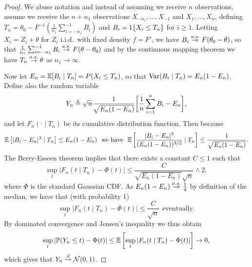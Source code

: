 \begin{proof}
  We abuse notation and instead of assuming we receive $n$ observations, assume
  we receive the $n + n_1$ observations $X_{-n_1}, \ldots, X_{-1}$ and
  $X_1, \ldots, X_n$, defining $T_n = \theta_0 - F^{-1}(\frac{1}{n_1}
  \sum_{i = -n_1}^{-1} B_i)$ and
  $B_i = 1\!\left\{X_i \le T_n\right\}$ for $i \ge 1$.
  Letting $X_i = Z_i + \theta$ for $Z_i$ i.i.d.\ with fixed density
  $f = F'$, we have
  $B_i \stackrel{a.s.}{\rightarrow} F(\theta_0 - \theta)$, so that
  $\frac{1}{n_1} \sum_{i = -n_1}^{-1} B_i \stackrel{a.s.}{\rightarrow} F(\theta - \theta_0)$ and
  by the continuous
  mapping theorem we have $T_n \stackrel{a.s.}{\rightarrow} \theta$ as $n_1 \to \infty$.

  Now let
  $E_n = \mathbb{E}[B_i \mid T_n] = P(X_i \le T_n)$,
  so that $\textup{Var}(B_i \mid T_n) = E_n(1 - E_n)$. Define also the random
  variable
  \begin{equation*}
    Y_n \triangleq \sqrt{n}
    \frac{1}{\sqrt{E_n (1 - E_n)}}
    \bigg[\frac{1}{n}\sum_{i = 1}^n B_i - E_n\bigg],
  \end{equation*}
  and let $F_n(\cdot \mid T_n)$ be its cumulative distribution function.
  Then because
  \begin{equation*}
    \mathbb{E}\left[|B_i - E_n|^3 \mid T_n\right] \le E_n(1 - E_n)
    ~~ \mbox{we have} ~~
    \mathbb{E}\left[\frac{|B_i - E_n|^3}{(E_n(1 - E_n))^{3/2}} \mid T_n\right]
    \le \frac{1}{\sqrt{E_n(1 - E_n)}}.
  \end{equation*}
 The Berry-Esseen theorem implies that there exists a constant
  $C \le 1$ such that
  \begin{equation*}
    \sup_t \left|F_n(t \mid T_n) - \Phi(t) \right|
    \le \frac{C}{\sqrt{E_n (1 - E_n)} \sqrt{n}} \wedge 2,
  \end{equation*}
  where $\Phi$ is the standard Gaussian CDF.
  As $E_n (1 - E_n) \stackrel{a.s.}{\rightarrow} \frac{1}{4}$ by definition of the median,
  we have
  that (with probability 1)
  \begin{equation*}
    \sup_t \left|F_n(t \mid T_n) - \Phi(t)\right| \le \frac{C}{\sqrt{n}}
    ~~ \mbox{eventually}.
  \end{equation*}
  By dominated convergence and Jensen's inequality we thus obtain
  \begin{equation*}
    \sup_t \left|\mathbb{P}(Y_n \le t) - \Phi(t)\right|
    \le \mathbb{E}\left[
      \sup_t \left|F_n(t \mid T_n) - \Phi(t)\right| \right]
    \to 0,
  \end{equation*}
  which gives that $Y_n \stackrel{d}{\rightsquigarrow} \mathcal{N}(0, 1)$.


\end{proof}
